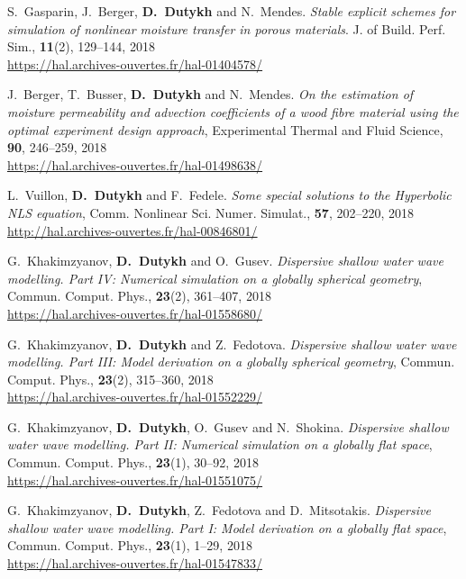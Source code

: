 \begin{etaremune}
  \item S.~Gasparin, J.~Berger, \textbf{D.~Dutykh} and N.~Mendes. \textit{Stable explicit schemes for simulation of nonlinear moisture transfer in porous materials}. J. of Build. Perf. Sim., \textbf{11}(2), 129--144, 2018 \\ %
  \url{https://hal.archives-ouvertes.fr/hal-01404578/}

  \item J.~Berger, T.~Busser, \textbf{D.~Dutykh} and N.~Mendes. \textit{On the estimation of moisture permeability and advection coefficients of a wood fibre material using the optimal experiment design approach}, Experimental Thermal and Fluid Science, \textbf{90}, 246--259, 2018 \\ %
  \url{https://hal.archives-ouvertes.fr/hal-01498638/}
  
  \item L.~Vuillon, \textbf{D.~Dutykh} and F.~Fedele. \textit{Some special solutions to the Hyperbolic NLS equation}, Comm. Nonlinear Sci. Numer. Simulat., \textbf{57}, 202--220, 2018 \\ %
  \url{http://hal.archives-ouvertes.fr/hal-00846801/}

  \item G.~Khakimzyanov, \textbf{D.~Dutykh} and O.~Gusev. \textit{Dispersive shallow water wave modelling. Part IV: Numerical simulation on a globally spherical geometry}, Commun. Comput. Phys., \textbf{23}(2), 361--407, 2018 \\ %
  \url{https://hal.archives-ouvertes.fr/hal-01558680/}

  \item G.~Khakimzyanov, \textbf{D.~Dutykh} and Z.~Fedotova. \textit{Dispersive shallow water wave modelling. Part III: Model derivation on a globally spherical geometry}, Commun. Comput. Phys., \textbf{23}(2), 315--360, 2018 \\ %
  \url{https://hal.archives-ouvertes.fr/hal-01552229/}

  \item G.~Khakimzyanov, \textbf{D.~Dutykh}, O.~Gusev and N.~Shokina. \textit{Dispersive shallow water wave modelling. Part II: Numerical simulation on a globally flat space}, Commun. Comput. Phys., \textbf{23}(1), 30--92, 2018 \\ %
  \url{https://hal.archives-ouvertes.fr/hal-01551075/}

  \item G.~Khakimzyanov, \textbf{D.~Dutykh}, Z.~Fedotova and D.~Mitsotakis. \textit{Dispersive shallow water wave modelling. Part I: Model derivation on a globally flat space}, Commun. Comput. Phys., \textbf{23}(1), 1--29, 2018 \\ %
  \url{https://hal.archives-ouvertes.fr/hal-01547833/}
  

\end{etaremune}
